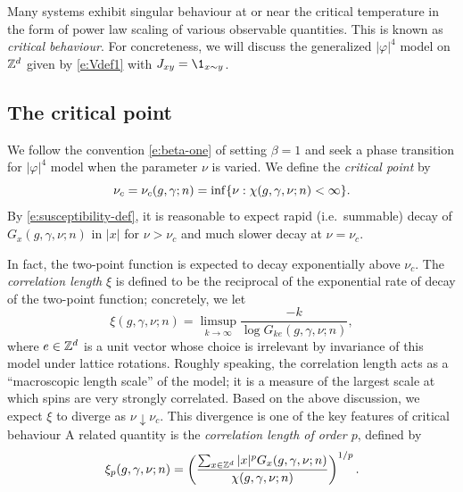 Many systems exhibit singular behaviour at or near the critical temperature in
the form of power law scaling of various observable quantities. This is known as
\emph{critical behaviour}. For concreteness, we will discuss the generalized
$|\varphi|^4$ model on ${ {{\mathbb Z}}^d }$ given by \eqref{e:Vdef1}
with $J_{xy} = \1_{x\sim y}$.


\subsection{The critical point}

We follow the convention \eqref{e:beta-one} of setting $\beta = 1$ and seek a
phase transition for $|\varphi|^4$ model when the parameter $\nu$ is varied.
We define the \emph{critical point} by
\begin{equation}
\nu_c = \nu_c(g, \gamma; n) = \inf \{ \nu : \chi(g, \gamma, \nu; n) < \infty \}.
\end{equation}
By \eqref{e:susceptibility-def}, it is
reasonable to expect rapid (i.e.\ summable) decay of $G_x(g, \gamma, \nu; n)$ in $|x|$ for
$\nu > \nu_c$ and much slower decay at $\nu = \nu_c$.

In fact, the two-point function is expected to decay exponentially above $\nu_c$.
The \emph{correlation length} $\xi$ is defined to be the reciprocal of the exponential
rate of decay of the two-point function; concretely, we let
\begin{equation}
\label{e:cl-spins}
\xi(g, \gamma, \nu; n) = \limsup_{k\to\infty} \frac{-k}{\log G_{ke}(g, \gamma, \nu; n)},
\end{equation}
where $e \in { {{\mathbb Z}}^d }$ is a unit vector whose choice is irrelevant by invariance of this model
under lattice rotations.
Roughly speaking, the correlation length acts as
a ``macroscopic length scale'' of the model; it is a measure of the largest scale at
which spins are very strongly correlated. Based on the above discussion, we expect $\xi$
to diverge as $\nu\downarrow\nu_c$. This divergence is one of the
key features of critical behaviour
A related quantity is the \emph{correlation length of order $p$}, defined by
\begin{equation}
\label{e:clp-spins}
\xi_p(g, \gamma, \nu; n)
	=
\left(\frac{\sum_{x\in{ {{\mathbb Z}}^d }} |x|^p G_x(g, \gamma, \nu; n)}{\chi(g, \gamma, \nu; n)}\right)^{1/p}.
\end{equation}

